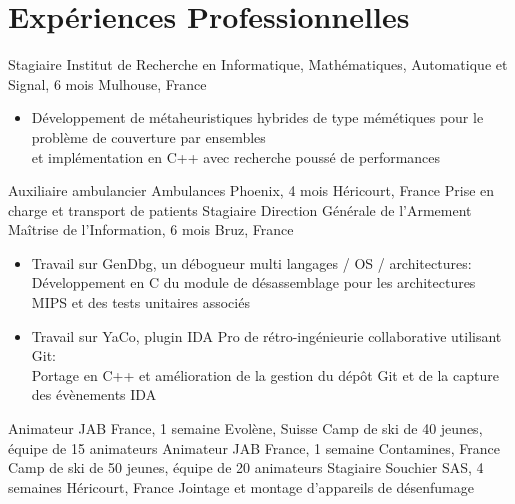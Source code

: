 \documentclass[letterpaper,10pt,sans]{moderncv}
\begin{document}
	\section{Expériences Professionnelles}
			{Stagiaire}
			{Institut de Recherche en Informatique, Mathématiques, Automatique et Signal, 6 mois\hspace{-25pt}}
			{Mulhouse, France}
			{}
			{}
			\vspace{-5pt}
			\begin{itemize}
				\item Développement de métaheuristiques hybrides de type mémétiques pour le problème de couverture par ensembles\\
				et implémentation en C++ avec recherche poussé de performances
			\end{itemize}
			\vspace{5pt}
			{Auxiliaire ambulancier}
			{Ambulances Phoenix, 4 mois}
			{Héricourt, France}
			{Prise en charge et transport de patients}
			{}
			{Stagiaire}
			{Direction Générale de l'Armement Maîtrise de l'Information, 6 mois}
			{Bruz, France}
			{}
			{}
			\vspace{-5pt}
			\begin{itemize}
				\item Travail sur GenDbg, un débogueur multi langages / OS / architectures:\\
					\phantom{=}Développement en C du module de désassemblage pour les architectures MIPS et des tests unitaires associés
				\item Travail sur YaCo, plugin IDA Pro de rétro-ingénieurie collaborative utilisant Git:\\
					\phantom{=}Portage en C++ et amélioration de la gestion du dépôt Git et de la capture des évènements IDA
			\end{itemize}
			\vspace{5pt}
			{Animateur}
			{JAB France, 1 semaine}
			{Evolène, Suisse}
			{Camp de ski de 40 jeunes, équipe de 15 animateurs}
			{}
			{Animateur}
			{JAB France, 1 semaine}
			{Contamines, France}
			{Camp de ski de 50 jeunes, équipe de 20 animateurs}
			{}
			{Stagiaire}
			{Souchier SAS, 4 semaines}
			{Héricourt, France}
			{Jointage et montage d'appareils de désenfumage}
			{}
\end{document}
